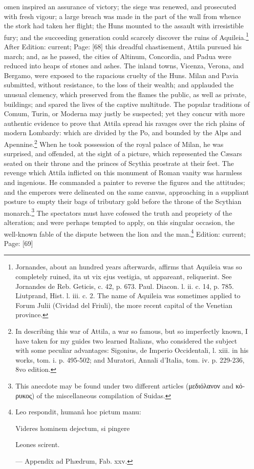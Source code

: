 omen inspired an assurance of victory; the siege was renewed, and prosecuted with fresh vigour; a large breach was made in the part of the wall from whence the stork had taken her flight; the Huns mounted to the assault with irresistible fury; and the succeeding generation could scarcely discover the ruins of Aquileia.\footnote{Jornandes, about an hundred years afterwards, affirms that Aquileia was so completely ruined, ita ut vix ejus vestigia, ut appareant, reliquerint. See Jornandes de Reb. Geticis, c. 42, p. 673. Paul. Diacon. l. ii. c. 14, p. 785. Liutprand, Hist. l. iii. c. 2. The name of Aquileia was sometimes applied to Forum Julii (Cividad del Friuli), the more recent capital of the Venetian province.} After Edition: current; Page: [68] this dreadful chastisement, Attila pursued his march; and, as he passed, the cities of Altinum, Concordia, and Padua were reduced into heaps of stones and ashes. The inland towns, Vicenza, Verona, and Bergamo, were exposed to the rapacious cruelty of the Huns. Milan and Pavia submitted, without resistance, to the loss of their wealth; and applauded the unusual clemency, which preserved from the flames the public, as well as private, buildings; and spared the lives of the captive multitude. The popular traditions of Comum, Turin, or Moderna may justly be suspected; yet they concur with more authentic evidence to prove that Attila spread his ravages over the rich plains of modern Lombardy: which are divided by the Po, and bounded by the Alps and Apennine.\footnote{In describing this war of Attila, a war so famous, but so imperfectly known, I have taken for my guides two learned Italians, who considered the subject with some peculiar advantages: Sigonius, de Imperio Occidentali, l. xiii. in his works, tom. i. p. 495-502; and Muratori, Annali d\texthebrew{}’Italia, tom. iv. p. 229-236, 8vo edition.} When he took possession of the royal palace of Milan, he was surprised, and offended, at the sight of a picture, which represented the Cæsars seated on their throne and the princes of Scythia prostrate at their feet. The revenge which Attila inflicted on this monument of Roman vanity was harmless and ingenious. He commanded a painter to reverse the figures and the attitudes; and the emperors were delineated on the same canvas, approaching in a suppliant posture to empty their bags of tributary gold before the throne of the Scythian monarch.\footnote{This anecdote may be found under two different articles (\textgreek{μεδιόλανον} and \textgreek{κόρυκος}) of the miscellaneous compilation of Suidas.} The spectators must have cofessed the truth and propriety of the alteration; and were perhaps tempted to apply, on this singular occasion, the well-known fable of the dispute between the lion and the man.\footnote{Leo respondit, humanâ hoc pictum manu:

Videres hominem dejectum, si pingere

Leones scirent.

\texthebrew{—} Appendix ad Phædrum, Fab. xxv.}
Edition: current; Page: [69]


